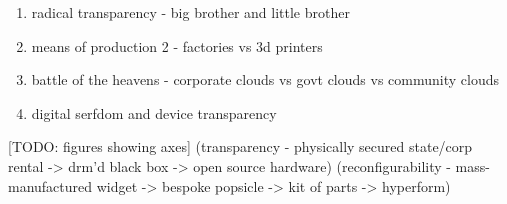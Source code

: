     \begin{enumerate}
        \item radical transparency - big brother and little brother
        \item means of production 2 - factories vs 3d printers
        \item battle of the heavens - corporate clouds vs govt clouds vs community clouds
        \item digital serfdom and device transparency
    \end{enumerate}
    
    [TODO: figures showing axes] (transparency - physically secured state/corp rental -> drm'd black box -> open source hardware) (reconfigurability - mass-manufactured widget -> bespoke popsicle -> kit of parts -> hyperform)
